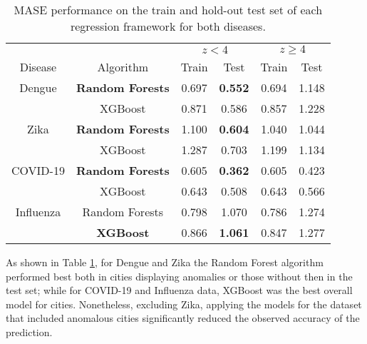 \begin{table}[h]
	\centering
	\caption{\label{tab:best_model} MASE performance on the train and hold-out test set of each regression framework for both diseases.}
	
		\begin{tabular}{c | c | c  c | c  c }
			\hline\hline
			\multicolumn{1}{c|}{} & \multicolumn{1}{c|}{} & \multicolumn{2}{c|}{$z < 4$} & \multicolumn{2}{c}{$z \geqslant 4$}\\
			
			\multicolumn{1}{c|}{Disease} & \multicolumn{1}{c|}{Algorithm} & \multicolumn{1}{c}{Train} & \multicolumn{1}{c|}{Test} &\multicolumn{1}{c}{Train} & \multicolumn{1}{c}{Test}\\[1ex]
			
			\hline
			Dengue	& \textbf{Random Forests} & 0.697 & \textbf{0.552} & 0.694 & 1.148 \rule{0pt}{2.6ex} \\
					& XGBoost 		          & 0.871 & 0.586 & 0.857 & 1.228 \\[1ex]
			  \hline
            Zika	& \textbf{Random Forests}  & 1.100 & \textbf{0.604} & 1.040 & 1.044 \rule{0pt}{2.6ex} \\
			 			& XGBoost		       & 1.287 & 0.703 & 1.199 & 1.134 \\ [1ex]
            \hline
			COVID-19	& \textbf{Random Forests}      & 0.605 & \textbf{0.362} & 0.605 & 0.423 \rule{0pt}{2.6ex} \\
			 			& XGBoost 	                   & 0.643 & 0.508 & 0.643 & 0.566 \\ [1ex]
            \hline
            Influenza	& Random Forests       & 0.798 & 1.070 & 0.786 & 1.274 \rule{0pt}{2.6ex} \\
			 			& \textbf{XGBoost} 	   & 0.866 & \textbf{1.061} & 0.847 & 1.277 \\ [1ex]
       
		\hline\hline	
		\end{tabular}
\end{table}

As shown in Table \ref{tab:best_model}, for Dengue and Zika the Random Forest algorithm performed best both in cities displaying anomalies or those without then in the test set; while for COVID-19 and Influenza data, XGBoost was the best overall model for cities. Nonetheless, excluding Zika, applying the models for the dataset that included anomalous cities significantly reduced the observed accuracy of the prediction. 

